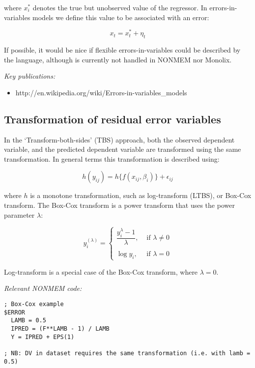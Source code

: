 \documentclass[a4paper,11pt]{article}
\begin{document}
\noindent where $x_i^\ast$ denotes the true but unobserved value of
the regressor. In errors-in-variables models we define this value to be associated with an error:

\begin{equation}
x_t = x_t^\ast + \eta_t
\end{equation}

If possible, it would be nice if flexible errors-in-variables could be
described by the language, although is currently not handled in NONMEM
nor Monolix.

\vspace{10pt}
\noindent \emph{Key publications:}
\begin{itemize}
\item http://en.wikipedia.org/wiki/Errors-in-variables\_models
\end{itemize}

\subsection{Transformation of residual error variables}
In the `Transform-both-sides' (TBS) approach, both the observed
dependent variable, and the predicted dependent variable are
transformed using the same transformation. In general terms this
transformation is described using:

\begin{equation}
h(y_{ij}) = h \{ f(x_{ij}, \beta_i) \} + \epsilon_{ij}
\end{equation}

\noindent where $h$ is a monotone transformation, such as
log-transform (LTBS), or Box-Cox transform. The Box-Cox transform is a
power transform that uses the power parameter $\lambda$:

\begin{equation}
y_i^{(\lambda)} =
\begin{cases}
\dfrac{y_i^\lambda-1}{\lambda}, &\mbox{ if } \lambda \neq 0 \\ \\
\log{y_i} , &\mbox{ if } \lambda = 0
\end{cases}
\end{equation}

\noindent Log-transform is a special case of the Box-Cox transform, where $\lambda = 0$.

\noindent \emph{Relevant NONMEM code:}
\begin{lstlisting}
; Box-Cox example
$ERROR
  LAMB = 0.5
  IPRED = (F**LAMB - 1) / LAMB
  Y = IPRED + EPS(1)

; NB: DV in dataset requires the same transformation (i.e. with lamb = 0.5)
\end{lstlisting}
\end{document}
